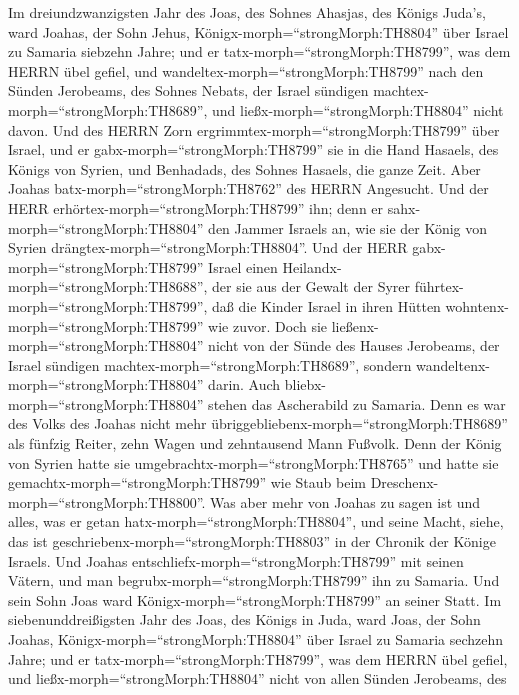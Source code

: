  Im dreiundzwanzigsten Jahr des Joas, des Sohnes Ahasjas,
des Königs Juda's, ward Joahas, der Sohn Jehus,
Königx-morph=``strongMorph:TH8804'' über Israel zu Samaria siebzehn
Jahre;  und er tatx-morph=``strongMorph:TH8799'', was dem
HERRN übel gefiel, und wandeltex-morph=``strongMorph:TH8799'' nach den
Sünden Jerobeams, des Sohnes Nebats, der Israel sündigen
machtex-morph=``strongMorph:TH8689'', und
ließx-morph=``strongMorph:TH8804'' nicht davon.  Und des
HERRN Zorn ergrimmtex-morph=``strongMorph:TH8799'' über Israel, und er
gabx-morph=``strongMorph:TH8799'' sie in die Hand Hasaels, des Königs
von Syrien, und Benhadads, des Sohnes Hasaels, die ganze Zeit.
 Aber Joahas batx-morph=``strongMorph:TH8762'' des HERRN
Angesucht. Und der HERR erhörtex-morph=``strongMorph:TH8799'' ihn; denn
er sahx-morph=``strongMorph:TH8804'' den Jammer Israels an, wie sie der
König von Syrien drängtex-morph=``strongMorph:TH8804''.  Und
der HERR gabx-morph=``strongMorph:TH8799'' Israel einen
Heilandx-morph=``strongMorph:TH8688'', der sie aus der Gewalt der Syrer
führtex-morph=``strongMorph:TH8799'', daß die Kinder Israel in ihren
Hütten wohntenx-morph=``strongMorph:TH8799'' wie zuvor. 
Doch sie ließenx-morph=``strongMorph:TH8804'' nicht von der Sünde des
Hauses Jerobeams, der Israel sündigen
machtex-morph=``strongMorph:TH8689'', sondern
wandeltenx-morph=``strongMorph:TH8804'' darin. Auch
bliebx-morph=``strongMorph:TH8804'' stehen das Ascherabild zu Samaria.
 Denn es war des Volks des Joahas nicht mehr
übriggebliebenx-morph=``strongMorph:TH8689'' als fünfzig Reiter, zehn
Wagen und zehntausend Mann Fußvolk. Denn der König von Syrien hatte sie
umgebrachtx-morph=``strongMorph:TH8765'' und hatte sie
gemachtx-morph=``strongMorph:TH8799'' wie Staub beim
Dreschenx-morph=``strongMorph:TH8800''.  Was aber mehr von
Joahas zu sagen ist und alles, was er getan
hatx-morph=``strongMorph:TH8804'', und seine Macht, siehe, das ist
geschriebenx-morph=``strongMorph:TH8803'' in der Chronik der Könige
Israels.  Und Joahas
entschliefx-morph=``strongMorph:TH8799'' mit seinen Vätern, und man
begrubx-morph=``strongMorph:TH8799'' ihn zu Samaria. Und sein Sohn Joas
ward Königx-morph=``strongMorph:TH8799'' an seiner Statt. 
Im siebenunddreißigsten Jahr des Joas, des Königs in Juda, ward Joas,
der Sohn Joahas, Königx-morph=``strongMorph:TH8804'' über Israel zu
Samaria sechzehn Jahre;  und er
tatx-morph=``strongMorph:TH8799'', was dem HERRN übel gefiel, und
ließx-morph=``strongMorph:TH8804'' nicht von allen Sünden Jerobeams, des
